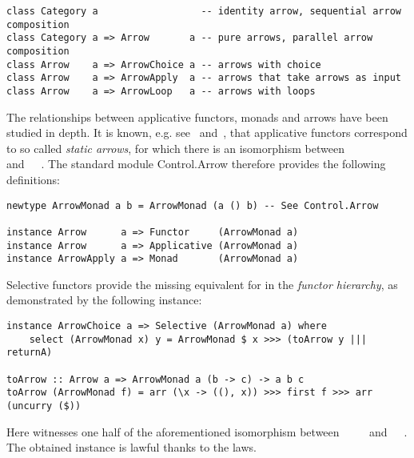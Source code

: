 \vspace{1mm}
\begin{verbatim}
class Category a                  -- identity arrow, sequential arrow composition
class Category a => Arrow       a -- pure arrows, parallel arrow composition
class Arrow    a => ArrowChoice a -- arrows with choice
class Arrow    a => ArrowApply  a -- arrows that take arrows as input
class Arrow    a => ArrowLoop   a -- arrows with loops
\end{verbatim}
\vspace{1mm}

\noindent
The relationships between applicative functors, monads and arrows have been
studied in depth. It is known, e.g. see~\citet{lindley2011idioms}
and~\citet{rivas2017notions}, that applicative functors correspond to so called
\emph{static arrows}, for which there is an isomorphism between
~\hs{()}~\hs{(}~\hs{->}~ and~~~. The
standard module \textsf{Control.Arrow} therefore provides the following
definitions:

\vspace{1mm}
\begin{verbatim}
newtype ArrowMonad a b = ArrowMonad (a () b) -- See Control.Arrow

instance Arrow      a => Functor     (ArrowMonad a)
instance Arrow      a => Applicative (ArrowMonad a)
instance ArrowApply a => Monad       (ArrowMonad a)
\end{verbatim}
\vspace{1mm}

\noindent
Selective functors provide the missing equivalent for  in the
\emph{functor hierarchy}, as demonstrated by the following instance:

\vspace{1mm}
\begin{verbatim}
instance ArrowChoice a => Selective (ArrowMonad a) where
    select (ArrowMonad x) y = ArrowMonad $ x >>> (toArrow y ||| returnA)

toArrow :: Arrow a => ArrowMonad a (b -> c) -> a b c
toArrow (ArrowMonad f) = arr (\x -> ((), x)) >>> first f >>> arr (uncurry ($))
\end{verbatim}
\vspace{1mm}

\noindent
Here  witnesses one half of the aforementioned isomorphism between
~\hs{()}~\hs{(}~\hs{->}~ and~~~. The
obtained  instance is lawful thanks to the  laws.

